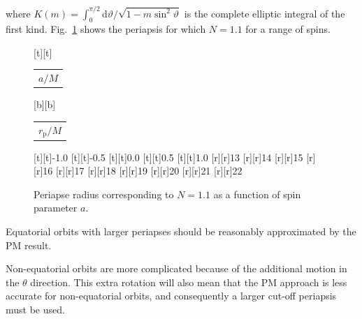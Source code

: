\documentclass[aps,prd,reprint,showpacs,groupedaddress]{revtex4-1}
\newcommand{\Figref}[1]{Fig.\ \ref{fig:#1}}
\newcommand{\dd}{\ensuremath{\mathrm{d}}}
\begin{document}
where $K(m) = \int_{0}^{\pi/2}{\dd\vartheta/\sqrt{1-m\sin^2\vartheta}}$ is the complete elliptic integral of the first kind. \Figref{N_peri} shows the periapsis for which $N = 1.1$ for a range of spins.
\begin{figure}
\begin{psfrags}%
\psfragscanon%
%
[t][t]{\color[rgb]{0,0,0}\setlength{\tabcolsep}{0pt}\begin{tabular}{c}{\Large$a/M$}\end{tabular}}%
[b][b]{\color[rgb]{0,0,0}\setlength{\tabcolsep}{0pt}\begin{tabular}{c}{\Large$r_\text{p}/M$}\end{tabular}}%
%
[t][t]{-1.0}%
[t][t]{-0.5}%
[t][t]{0.0}%
[t][t]{0.5}%
[t][t]{1.0}%
%
[r][r]{13}%
[r][r]{14}%
[r][r]{15}%
[r][r]{16}%
[r][r]{17}%
[r][r]{18}%
[r][r]{19}%
[r][r]{20}%
[r][r]{21}%
[r][r]{22}%

%
%
\end{psfrags}%
\caption{Periapse radius corresponding to $N = 1.1$ as a function of spin parameter $a$.\label{fig:N_peri}}
\end{figure}
Equatorial orbits with larger periapses should be reasonably approximated by the PM result.

Non-equatorial orbits are more complicated because of the additional motion in the $\theta$ direction. This extra rotation will also mean that the PM approach is less accurate for non-equatorial orbits, and consequently a larger cut-off periapsis must be used.
\end{document}
